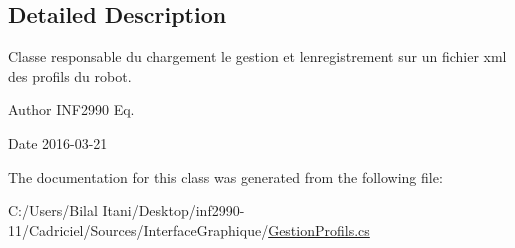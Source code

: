 \subsection{Detailed Description}
Classe responsable du chargement le gestion et l\textquotesingle{}enregistrement sur un fichier xml des profils du robot. 

\begin{DoxyAuthor}{Author}
I\+N\+F2990 Eq. 
\end{DoxyAuthor}
\begin{DoxyDate}{Date}
2016-\/03-\/21 
\end{DoxyDate}


The documentation for this class was generated from the following file\+:\begin{DoxyCompactItemize}
\item 
C\+:/\+Users/\+Bilal Itani/\+Desktop/inf2990-\/11/\+Cadriciel/\+Sources/\+Interface\+Graphique/\hyperlink{_gestion_profils_8cs}{Gestion\+Profils.\+cs}\end{DoxyCompactItemize}
